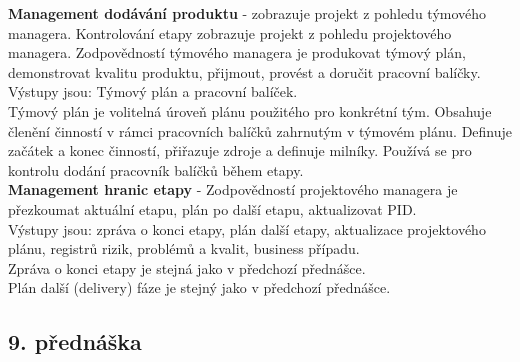\documentclass[11pt,a4paper]{article}
\begin{document}
        \textbf{Management dodávání produktu} - zobrazuje projekt z pohledu týmového managera. Kontrolování etapy zobrazuje projekt z pohledu projektového managera. Zodpovědností týmového managera je produkovat týmový plán, demonstrovat kvalitu produktu, přijmout, provést a doručit pracovní balíčky.\\
        Výstupy jsou: Týmový plán a pracovní balíček.\\
        Týmový plán je volitelná úroveň plánu použitého pro konkrétní tým. Obsahuje členění činností v rámci pracovních balíčků zahrnutým v týmovém plánu. Definuje začátek a konec činností, přiřazuje zdroje a definuje milníky. Používá se pro kontrolu dodání pracovník balíčků během etapy.\\
        \textbf{Management hranic etapy} - Zodpovědností projektového managera je přezkoumat aktuální etapu, plán po další etapu, aktualizovat PID.\\
        Výstupy jsou: zpráva o konci etapy, plán další etapy, aktualizace projektového plánu, registrů rizik, problémů a kvalit, business případu.\\
        Zpráva o konci etapy je stejná jako v předchozí přednášce.\\
        Plán další (delivery) fáze je stejný jako v předchozí přednášce.
    \subsection{9. přednáška}
\end{document}
